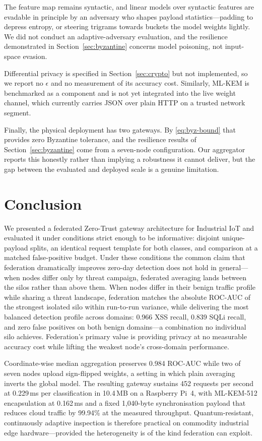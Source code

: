\documentclass[conference]{IEEEtran}
\begin{document}
The feature map remains syntactic, and linear models over syntactic features are evadable in principle by an adversary who shapes payload statistics---padding to depress entropy, or steering trigrams towards buckets the model weights lightly. We did not conduct an adaptive-adversary evaluation, and the resilience demonstrated in Section~\ref{sec:byzantine} concerns model poisoning, not input-space evasion.

Differential privacy is specified in Section~\ref{sec:crypto} but not implemented, so we report no $\epsilon$ and no measurement of its accuracy cost. Similarly, ML-KEM is benchmarked as a component and is not yet integrated into the live weight channel, which currently carries JSON over plain HTTP on a trusted network segment.

Finally, the physical deployment has two gateways. By \eqref{eq:byz-bound} that provides zero Byzantine tolerance, and the resilience results of Section~\ref{sec:byzantine} come from a seven-node configuration. Our aggregator reports this honestly rather than implying a robustness it cannot deliver, but the gap between the evaluated and deployed scale is a genuine limitation.

\section{Conclusion}
\label{sec:conclusion}
We presented a federated Zero-Trust gateway architecture for Industrial IoT and evaluated it under conditions strict enough to be informative: disjoint unique-payload splits, an identical request template for both classes, and comparison at a matched false-positive budget. Under these conditions the common claim that federation dramatically improves zero-day detection does not hold in general---when nodes differ only by threat campaign, federated averaging lands between the silos rather than above them. When nodes differ in their benign traffic profile while sharing a threat landscape, federation matches the absolute ROC-AUC of the strongest isolated silo within run-to-run variance, while delivering the most balanced detection profile across domains: 0.966 XSS recall, 0.839 SQLi recall, and zero false positives on both benign domains---a combination no individual silo achieves. Federation's primary value is providing privacy at no measurable accuracy cost while lifting the weakest node's cross-domain performance.

Coordinate-wise median aggregation preserves 0.984 ROC-AUC while two of seven nodes upload sign-flipped weights, a setting in which plain averaging inverts the global model. The resulting gateway sustains 452 requests per second at 0.229\,ms per classification in 10.4\,MB on a Raspberry Pi~4, with ML-KEM-512 encapsulation at 0.162\,ms and a fixed 1{,}040-byte synchronisation payload that reduces cloud traffic by 99.94\% at the measured throughput. Quantum-resistant, continuously adaptive inspection is therefore practical on commodity industrial edge hardware---provided the heterogeneity is of the kind federation can exploit.
\end{document}
